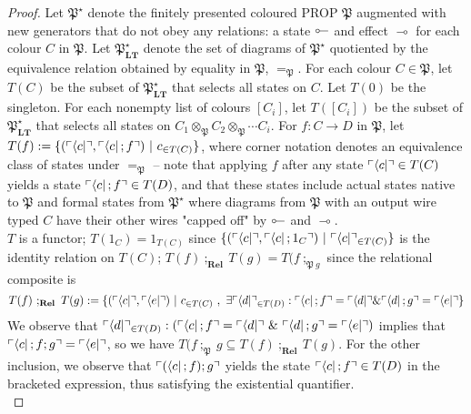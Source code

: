 \begin{fullwidth}
\begin{theorem}
\begin{proof}
Let $\mathfrak{P}^\star$ denote the finitely presented coloured PROP $\mathfrak{P}$ augmented with new generators that do not obey any relations: a state $\rotatebox[origin=c]{180}{$\multimap$}$ and effect $\multimap$ for each colour $C$ in $\mathfrak{P}$. Let $\mathfrak{P}^\star_{\mathbf{LT}}$ denote the set of diagrams of $\mathfrak{P}^\star$ quotiented by the equivalence relation obtained by equality in $\mathfrak{P}$, $=_\mathfrak{P}$. For each colour $C \in \mathfrak{P}$, let $T(C)$ be the subset of $\mathfrak{P}^\star_{\mathbf{LT}}$ that selects all states on $C$. Let $T(0)$ be the singleton. For each nonempty list of colours $[C_i]$, let $T([C_i])$ be the subset of $\mathfrak{P}^\star_{\mathbf{LT}}$ that selects all states on $C_1 \otimes_\mathfrak{P} C_2 \otimes_\mathfrak{P} \cdots C_i$. For $f: C \rightarrow D$ in $\mathfrak{P}$, let $T(f) := \{(\ulcorner \bra{c} \urcorner, \ulcorner \bra{c};f \urcorner) \ | \ c_{\in T(C)}\}$, where corner notation denotes an equivalence class of states under $=_\mathfrak{P}$ -- note that applying $f$ after any state $\ulcorner \bra{c} \urcorner \in T(C)$ yields a state $\ulcorner \bra{c} ; f \urcorner \in T(D)$, and that these states include actual states native to $\mathfrak{P}$ and formal states from $\mathfrak{P}^\star$ where diagrams from $\mathfrak{P}$ with an output wire typed $C$ have their other wires "capped off" by $\rotatebox[origin=c]{180}{$\multimap$}$ and $\multimap$.\\

$T$ is a functor; $T(1_C) = 1_{T(C)}$ since $\{(\ulcorner \bra{c} \urcorner, \ulcorner \bra{c};1_C \urcorner) \ | \ \ulcorner \bra{c} \urcorner_{\in T(C)}\}$ is the identity relation on $T(C)$; $T(f) \ ;_\textbf{Rel} \ T(g) = T(f \ ;_{\mathfrak{P} \ g}$ since the relational composite is
$$T(f) \ ;_\textbf{Rel} \ T(g) := \{(\ulcorner \bra{c} \urcorner, \ulcorner \bra{e} \urcorner) \ | \ c_{\in T(C)} \ , \ \exists \ulcorner \bra{d} \urcorner_{\in T(D)} : \ulcorner \bra{c};f \urcorner = \ulcorner \bra{d} \urcorner \& \ulcorner \bra{d};g \urcorner = \ulcorner \bra{e} \urcorner\}$$ We observe that $\ulcorner \bra{d} \urcorner_{\in T(D)} : (\ulcorner \bra{c};f \urcorner = \ulcorner \bra{d} \urcorner \ \& \ \ulcorner \bra{d};g \urcorner = \ulcorner \bra{e} \urcorner)$ implies that $\ulcorner \bra{c};f;g \urcorner = \ulcorner \bra{e} \urcorner$, so we have $T(f \ ;_{\mathfrak{P}} \ g \subseteq T(f) \ ;_\textbf{Rel} \ T(g)$. For the other inclusion, we observe that $\ulcorner (\bra{c};f);g \urcorner$ yields the state $\ulcorner \bra{c};f \urcorner \in T(D)$ in the bracketed expression, thus satisfying the existential quantifier.\\


\end{proof}
\end{theorem}
\end{fullwidth}
